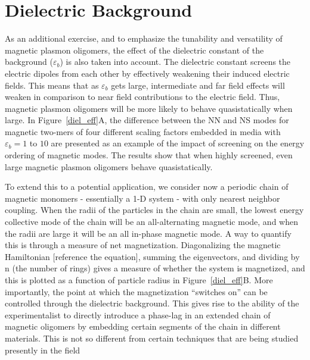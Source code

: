 \documentclass[journal=apchd5,manuscript=article]{achemso}
\begin{document}
\section{Dielectric Background}

As an additional exercise, and to emphasize the tunability and versatility of magnetic plasmon oligomers, the effect of the dielectric constant of the background ($\varepsilon_{b}$) is also taken into account. The dielectric constant screens the electric dipoles from each other by effectively weakening their induced electric fields. This means that as $\varepsilon_{b}$ gets large, intermediate and far field effects will weaken in comparison to near field contributions to the electric field. Thus, magnetic plasmon oligomers will be more likely to behave quasistatically when large. In Figure~\ref{diel_eff}A, the difference between the NN and NS modes for magnetic two-mers of four different scaling factors embedded in media with $\varepsilon_{b} = 1$ to $10$ are presented as an example of the impact of screening on the energy ordering of magnetic modes. The results show that when highly screened, even large magnetic plasmon oligomers behave quasistatically.

To extend this to a potential application, we consider now a periodic chain of magnetic monomers - essentially a 1-D system - with only nearest neighbor coupling. When the radii of the particles in the chain are small, the lowest energy collective mode of the chain will be an all-alternating magnetic mode, and when the radii are large it will be an all in-phase magnetic mode. A way to quantify this is through a measure of net magnetization. Diagonalizing the magnetic Hamiltonian [reference the equation], summing the eigenvectors, and dividing by n (the number of rings) gives a measure of whether the system is magnetized, and this is plotted as a function of particle radius in Figure~\ref{diel_eff}B. More importantly, the point at which the magnetization ``switches on'' can be controlled through the dielectric background. This gives rise to the ability of the experimentalist to directly introduce a phase-lag in an extended chain of magnetic oligomers by embedding certain segments of the chain in different materials. This is not so different from certain techniques that are being studied presently in the field\cite{odom_lasing}
\end{document}
